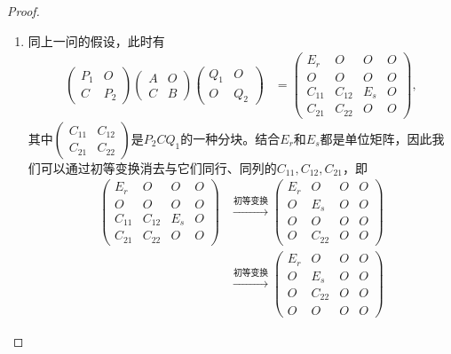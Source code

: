 \begin{enumerate}
\begin{proof}
\begin{enumerate}
        \item 同上一问的假设，此时有
        \begin{align*}
            \begin{pmatrix}
                P_1 & O \\ C & P_2
            \end{pmatrix}\begin{pmatrix}
                A & O \\ C & B
            \end{pmatrix}\begin{pmatrix}
                Q_1 & O \\ O & Q_2
            \end{pmatrix}&=\begin{pmatrix}
                E_r & O & O & O \\ O & O & O & O \\ C_{11} & C_{12} & E_s & O \\ C_{21} & C_{22} & O & O
            \end{pmatrix},
        \end{align*}
        其中$\begin{pmatrix}
            C_{11} & C_{12} \\ C_{21} & C_{22}
        \end{pmatrix}$是$P_2CQ_1$的一种分块。结合$E_r$和$E_s$都是单位矩阵，因此我们可以通过初等变换消去与它们同行、同列的$C_{11},C_{12},C_{21}$，即
        \begin{align*}
            \begin{pmatrix}
                E_r & O & O & O \\ O & O & O & O \\ C_{11} & C_{12} & E_s & O \\ C_{21} & C_{22} & O & O
            \end{pmatrix}&\xrightarrow{\text{初等变换}}\begin{pmatrix}
                E_r & O & O & O \\ O & E_s & O & O \\ O & O & O & O \\ O & C_{22} & O & O
            \end{pmatrix} \\
            &\xrightarrow{\text{初等变换}}\begin{pmatrix}
                E_r & O & O & O \\ O & E_s & O & O \\ O & C_{22} & O & O \\ O & O & O & O

\end{pmatrix}
\end{align*}
\end{enumerate}
\end{proof}
\end{enumerate}
